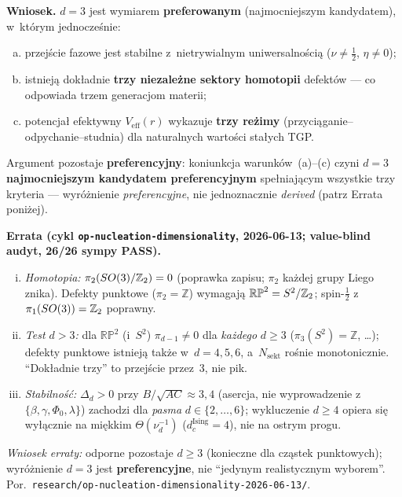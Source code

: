 \begin{remark}[Wzmocnienie ilo\'sciowe argumentu za $d = 3$]
\medskip
\noindent\textbf{Wniosek.}
$d = 3$ jest wymiarem \textbf{preferowanym} (najmocniejszym kandydatem),
w~kt\'orym jednocze\'snie:
\begin{enumerate}[(a),nosep]
  \item przej\'scie fazowe jest stabilne z~nietrywialnym
        uniwersalno\'sci\k{a} ($\nu \neq \tfrac{1}{2}$,
        $\eta \neq 0$);
  \item istniej\k{a} dok\l{}adnie \textbf{trzy niezale\.zne
        sektory homotopii} defekt\'ow --- co odpowiada
        trzem generacjom materii;
  \item potencja\l{} efektywny $V_{\mathrm{eff}}(r)$ wykazuje
        \textbf{trzy re\.zimy} (przyci\k{a}ganie--odpychanie--studnia)
        dla naturalnych warto\'sci sta\l{}ych TGP.
\end{enumerate}
Argument pozostaje \textbf{preferencyjny}: koniunkcja
warunk\'ow~(a)--(c) czyni $d = 3$ \textbf{najmocniejszym kandydatem
preferencyjnym} spe\l{}niaj\k{a}cym wszystkie trzy kryteria --- wyr\'o\.znienie
\emph{preferencyjne}, nie jednoznacznie \emph{derived} (patrz Errata poni\.zej).

\medskip
\noindent\textbf{Errata (cykl \texttt{op-nucleation-dimensionality}, 2026-06-13;
value-blind audyt, 26/26 sympy PASS).}
\begin{enumerate}[(i),nosep]
  \item \emph{Homotopia:} $\pi_2(SO(3)/\mathbb{Z}_2) = 0$ (poprawka zapisu;
        $\pi_2$ ka\.zdej grupy Liego znika). Defekty punktowe
        ($\pi_2 = \mathbb{Z}$) wymagaj\k{a} $\mathbb{RP}^2 = S^2/\mathbb{Z}_2$;
        spin-$\tfrac12$ z~$\pi_1(SO(3)) = \mathbb{Z}_2$ poprawny.
  \item \emph{Test $d > 3$:} dla $\mathbb{RP}^2$ (i~$S^2$) $\pi_{d-1} \neq 0$
        dla \emph{ka\.zdego} $d \geq 3$ ($\pi_3(S^2) = \mathbb{Z}$, \dots);
        defekty punktowe istniej\k{a} tak\.ze w~$d = 4,5,6$, a~$N_{\mathrm{sekt}}$
        ro\'snie monotonicznie. ``Dok\l{}adnie trzy'' to przej\'scie przez~3, nie pik.
  \item \emph{Stabilno\'s\'c:} $\Delta_d > 0$ przy $B/\sqrt{AC} \approx 3{,}4$
        (asercja, nie wyprowadzenie z~$\{\beta,\gamma,\Phi_0,\lambda\}$) zachodzi
        dla \emph{pasma} $d \in \{2,\dots,6\}$; wykluczenie $d \geq 4$ opiera
        si\k{e} wy\l{}\k{a}cznie na mi\k{e}kkim $\Theta(\nu_d^{-1})$
        ($d_c^{\mathrm{Ising}} = 4$), nie na ostrym progu.
\end{enumerate}
\noindent\emph{Wniosek erraty:} odporne pozostaje $d \geq 3$ (konieczne dla
cz\k{a}stek punktowych); wyr\'o\.znienie $d = 3$ jest \textbf{preferencyjne}, nie
``jedynym realistycznym wyborem''. Por.\ \texttt{research/op-nucleation-dimensionality-2026-06-13/}.
\end{remark}
